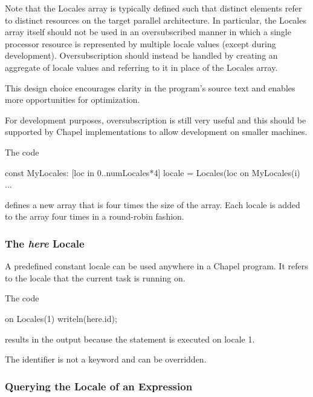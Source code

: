 Note that the Locales array is typically defined such that distinct
elements refer to distinct resources on the target parallel
architecture.  In particular, the Locales array itself should not be
used in an oversubscribed manner in which a single processor resource
is represented by multiple locale values (except during development).
Oversubscription should instead be handled by creating an aggregate of
locale values and referring to it in place of the Locales array.

\begin{rationale}
This design choice encourages clarity in the program's source text and
enables more opportunities for optimization.

For development purposes, oversubscription is still very useful and
this should be supported by Chapel implementations to allow
development on smaller machines.
\end{rationale}

\begin{example}
The code
\begin{chapel}
const MyLocales: [loc in 0..numLocales*4] locale = Locales(loc%
on MyLocales(i) ...
\end{chapel}
defines a new array  that is four times the size of
the  array.  Each locale is added to
the  array four times in a round-robin fashion.
\end{example}

\subsubsection{The {\em here} Locale}
\label{here}

A predefined constant locale  can be used anywhere in a
Chapel program.  It refers to the locale that the current task is
running on.

\begin{example}
The code
\begin{chapel}
on Locales(1) {
  writeln(here.id);
}
\end{chapel}
results in the output  because the  statement is
executed on locale 1.
\end{example}

The identifier  is not a keyword and can be overridden.

\subsubsection{Querying the Locale of an Expression}
\label{Querying_the_Locale_of_a_Variable}

